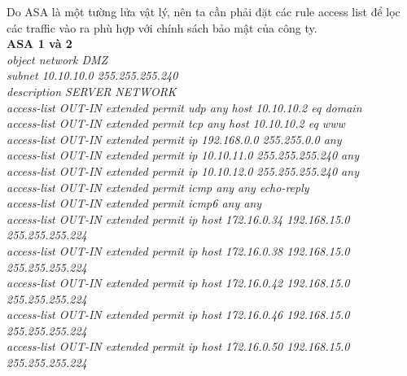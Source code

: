 \documentclass[12pt,a4paper]{report}
\begin{document}
\hspace*{1cm}Do ASA là một tường lửa vật lý, nên ta cần phải đặt các rule access list để lọc các traffic vào ra phù hợp với chính sách bảo mật của công ty. \\
\hspace*{1cm}\textbf{ASA 1 và 2}\\
\hspace*{1cm}\textit{object network DMZ\\
\hspace*{1cm}subnet 10.10.10.0 255.255.255.240\\
\hspace*{1cm}description SERVER NETWORK\\
\hspace*{1cm}access-list OUT-IN extended permit udp any host 10.10.10.2 eq domain \\
\hspace*{1cm}access-list OUT-IN extended permit tcp any host 10.10.10.2 eq www \\
\hspace*{1cm}access-list OUT-IN extended permit ip 192.168.0.0 255.255.0.0 any\\
\hspace*{1cm}access-list OUT-IN extended permit ip 10.10.11.0 255.255.255.240 any\\
\hspace*{1cm}access-list OUT-IN extended permit ip 10.10.12.0 255.255.255.240 any \\
\hspace*{1cm}access-list OUT-IN extended permit icmp any any echo-reply\\
\hspace*{1cm}access-list OUT-IN extended permit icmp6 any any\\
\hspace*{1cm}access-list OUT-IN extended permit ip host 172.16.0.34 192.168.15.0 255.255.255.224\\
\hspace*{1cm}access-list OUT-IN extended permit ip host 172.16.0.38 192.168.15.0 255.255.255.224\\
\hspace*{1cm}access-list OUT-IN extended permit ip host 172.16.0.42 192.168.15.0 255.255.255.224\\
\hspace*{1cm}access-list OUT-IN extended permit ip host 172.16.0.46 192.168.15.0 255.255.255.224\\
\hspace*{1cm}access-list OUT-IN extended permit ip host 172.16.0.50 192.168.15.0 255.255.255.224\\
}
\end{document}
